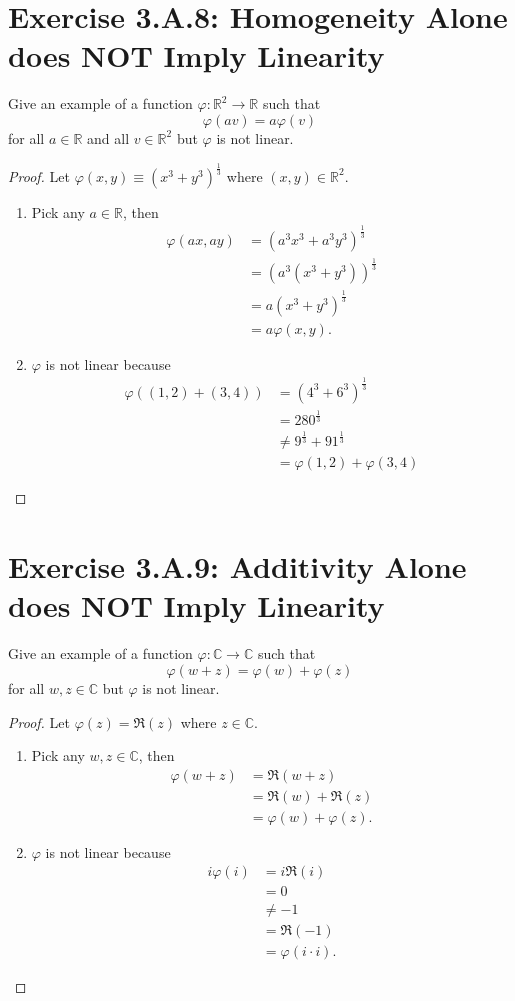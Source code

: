 \section{Exercise 3.A.8: Homogeneity Alone does NOT Imply Linearity}
Give an example of a function $\varphi:\mathbb{R}^2\to\mathbb{R}$ such that\[
\varphi(av)=a\varphi(v)
\]for all $a\in\mathbb{R}$ and all $v\in\mathbb{R}^2$ but $\varphi$ is not linear.
\begin{proof}
Let $\varphi(x,y)\equiv(x^3+y^3)^\frac{1}{3}$ where $(x,y)\in\mathbb{R}^2$.
\begin{enumerate}
\item Pick any $a\in\mathbb{R}$, then\[
\begin{split}
\varphi(ax,ay)&=(a^3x^3+a^3y^3)^\frac{1}{3}\\
&=(a^3(x^3+y^3))^\frac{1}{3}\\
&=a(x^3+y^3)^\frac{1}{3}\\
&=a\varphi(x,y).
\end{split}
\]
\item $\varphi$ is not linear because\[
\begin{split}
\varphi((1,2)+(3,4))&=(4^3+6^3)^\frac{1}{3}\\
&=280^\frac{1}{3}\\
&\ne9^\frac{1}{3}+91^\frac{1}{3}\\
&=\varphi(1,2)+\varphi(3,4)
\end{split}
\]
\end{enumerate}
\end{proof}

\section{Exercise 3.A.9: Additivity Alone does NOT Imply Linearity}
Give an example of a function $\varphi:\mathbb{C}\to\mathbb{C}$ such that\[
\varphi(w+z)=\varphi(w)+\varphi(z)
\]for all $w,z\in\mathbb{C}$ but $\varphi$ is not linear.
\begin{proof}
Let $\varphi(z)=\Re(z)$ where $z\in\mathbb{C}$.
\begin{enumerate}
\item Pick any $w,z\in\mathbb{C}$, then\[
\begin{split}
\varphi(w+z)&=\Re(w+z)\\
&=\Re(w)+\Re(z)\\
&=\varphi(w)+\varphi(z).
\end{split}
\]
\item $\varphi$ is not linear because\[
\begin{split}
i\varphi(i)&=i\Re(i)\\
&=0\\
&\ne -1\\
&=\Re(-1)\\
&=\varphi(i\cdot i).
\end{split}
\]
\end{enumerate}
\end{proof}

